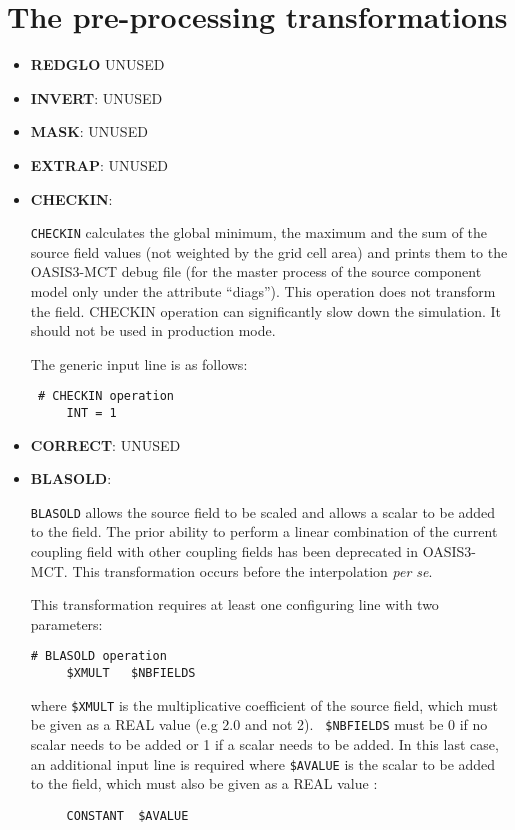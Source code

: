 \section{The pre-processing transformations}
\label{subsec_preproc}

\begin{itemize}

\item {\bf REDGLO} UNUSED

\item {\bf INVERT}: UNUSED

\item {\bf MASK}: UNUSED
 
\item {\bf EXTRAP}: UNUSED

\item {\bf CHECKIN}:

  {\tt CHECKIN} calculates the global minimum, the maximum and the sum
  of the source field values (not weighted by the grid cell area) and
  prints them to the OASIS3-MCT debug file (for the master process of
  the source component model only under the 
  attribute ``diags''). This operation does not transform the field.
  CHECKIN operation can significantly slow down the simulation. It should
  not be used in production mode.

  The generic input line is as follows:
 \begin{verbatim}
 # CHECKIN operation
     INT = 1  
\end{verbatim} 

\item {\bf CORRECT}: UNUSED

\item {\bf BLASOLD}:

  {\tt BLASOLD} allows the source field to be scaled and allows a
  scalar to be added to the field.  The prior ability to perform a
  linear combination of the current coupling field with other coupling
  fields has been deprecated in OASIS3-MCT.  This transformation
  occurs before the interpolation {\it per se}.

  This transformation requires at least one configuring line with two
  parameters:
 \begin{verbatim}
# BLASOLD operation
     $XMULT   $NBFIELDS 
\end{verbatim}
  where {\tt \$XMULT} is the multiplicative coefficient of the source
  field, which must be given as a REAL value (e.g 2.0 and not 2). {\tt
    \$NBFIELDS} must be 0 if no scalar needs to be added or 1 if a
  scalar needs to be added. In this last case, an additional input
  line is required where {\tt \$AVALUE} is the scalar to be added to
  the field, which must also be given as a REAL value :
\begin{verbatim}
     CONSTANT  $AVALUE
\end{verbatim} 
\end{itemize}

